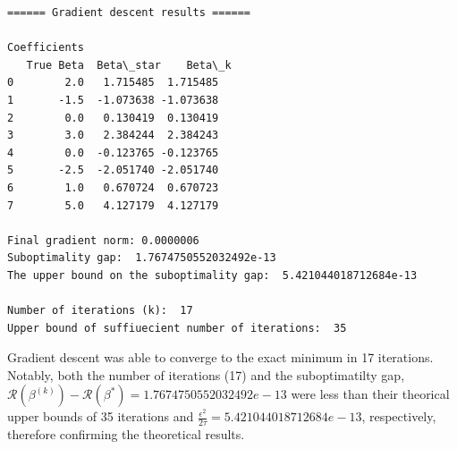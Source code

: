 \documentclass[11pt]{article}
\begin{document}
    \begin{Verbatim}[commandchars=\\\{\}]
====== Gradient descent results ======

Coefficients
   True Beta  Beta\_star    Beta\_k
0        2.0   1.715485  1.715485
1       -1.5  -1.073638 -1.073638
2        0.0   0.130419  0.130419
3        3.0   2.384244  2.384243
4        0.0  -0.123765 -0.123765
5       -2.5  -2.051740 -2.051740
6        1.0   0.670724  0.670723
7        5.0   4.127179  4.127179

Final gradient norm: 0.0000006
Suboptimality gap:  1.7674750552032492e-13
The upper bound on the suboptimality gap:  5.421044018712684e-13

Number of iterations (k):  17
Upper bound of suffiuecient number of iterations:  35
    \end{Verbatim}

    Gradient descent was able to converge to the exact minimum in 17
iterations. Notably, both the number of iterations (17) and the
suboptimatilty gap,
\(\mathcal{R}(\beta^{(k)})-\mathcal{R}(\beta^*)=1.7674750552032492e-13\)
were less than their theorical upper bounds of 35 iterations and
\(\frac{\epsilon^2}{2\tau}=5.421044018712684e-13\), respectively,
therefore confirming the theoretical results.


    
    
    
\end{document}
